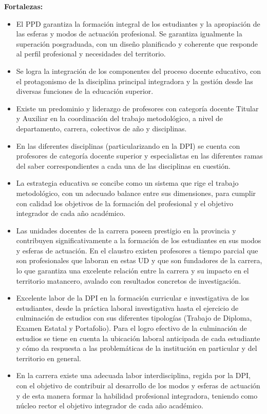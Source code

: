 \textbf{Fortalezas:}
\begin{itemize}
	\setlength\itemsep{-0.5em}
	\item El PPD garantiza la formación integral de los estudiantes y la apropiación de las esferas y modos de actuación profesional. Se garantiza igualmente la superación posgraduada, con un diseño planificado y coherente que responde al perfil profesional y necesidades del territorio.
	\item Se logra la integración de los componentes del proceso docente educativo, con el protagonismo de la disciplina principal integradora y la gestión desde las diversas funciones de la educación superior.
	\item Existe un predominio y liderazgo de profesores con categoría docente Titular y Auxiliar en la coordinación del trabajo metodológico, a nivel de departamento, carrera, colectivos de año y disciplinas.
	\item En las diferentes disciplinas (particularizando en la DPI) se cuenta con profesores de categoría docente superior y especialistas en las diferentes ramas del saber correspondientes a cada una de las disciplinas en cuestión.
	\item La estrategia educativa se concibe como un sistema que rige el trabajo metodológico, con un adecuado balance entre sus dimensiones, para cumplir con calidad los objetivos de la formación del profesional y el objetivo integrador de cada año académico.
	\item Las unidades docentes de la carrera poseen prestigio en la provincia y contribuyen significativamente a la formación de los estudiantes en sus modos y esferas de actuación. En el claustro existen profesores a tiempo parcial que son profesionales que laboran en estas UD y que son fundadores de la carrera, lo que garantiza una excelente relación entre la carrera y su impacto en el territorio matancero, avalado con resultados concretos de investigación. 
	\item Excelente labor de la DPI en la formación curricular e investigativa de los estudiantes, desde la práctica laboral investigativa hasta el ejercicio de culminación de estudios con sus diferentes tipologías (Trabajo de Diploma, Examen Estatal y Portafolio). Para el logro efectivo de la culminación de estudios se tiene en cuenta la ubicación laboral anticipada de cada estudiante y cómo da respuesta a las problemáticas de la institución en particular y del territorio en general.
	\item En la carrera existe una adecuada labor interdisciplina, regida por la DPI, con el objetivo de contribuir al desarrollo de los modos y esferas de actuación y de esta manera formar la habilidad profesional integradora, teniendo como núcleo rector el objetivo integrador de cada año académico.

\end{itemize}
